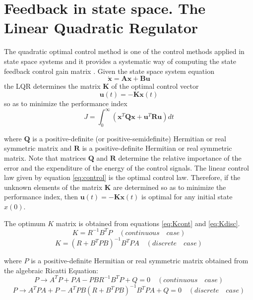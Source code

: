 \section{Feedback in state space. The Linear Quadratic Regulator}
\label{chap:control_sec:lqrDesign}
The quadratic optimal control method is one of the control methods applied in state space systems and it provides a systematic way of computing the state feedback control gain matrix \cite{Ogata}.
Given the state space system equation
\begin{equation}
\mathbf{\dot{x}} = \mathbf{A}\textbf{x} + \mathbf{B}\mathbf{u}
\end{equation}
the LQR determines the matrix $\mathbf{K}$ of the optimal control vector
\begin{equation}
\mathbf{u}(t) = -\mathbf{Kx}(t)
\label{eq:control}
\end{equation}
so as to minimize the performance index
\begin{equation}
J = \int_{0}^{\infty}(\mathbf{x}^{T}\mathbf{Qx}+\mathbf{u}^{T}\mathbf{Ru}) dt
\end{equation}

where $\mathbf{Q}$ is a positive-definite (or positive-semidefinite) Hermitian or real symmetric matrix and $\mathbf{R}$ is a positive-definite Hermitian or real symmetric matrix. Note that matrices $\mathbf{Q}$ and $\mathbf{R}$ determine the relative importance of the error and the expenditure of the energy of the control signals.
The linear control law given by equation \eqref{eq:control} is the optimal control law. Therefore, if the unknown elements of the matrix $\mathbf{K}$ are determined so as to minimize the performance index, then $\mathbf{u}(t) = -\mathbf{Kx}(t)$  is optimal for any initial state $x(0)$. 

The optimum $K$ matrix is obtained from equations \ref{eq:Kcont} and \ref{eq:Kdisc}.
\begin{equation}
K = R^{-1}B^{T}P \quad (continuous \quad case)
\label{eq:Kcont}
\end{equation}
\begin{equation}
K = (R + B^{T}PB)^{-1}B^{T}PA \quad (discrete \quad case)
\label{eq:Kdisc}
\end{equation}

where $P$ is a positive-definite Hermitian or real symmetric matrix obtained from the algebraic Ricatti Equation:
\begin{equation}
P \rightarrow A^{T}P+PA-PBR^{-1}B^{T}P+Q = 0 \quad (continuous \quad case)
\end{equation}
\begin{equation}
P \rightarrow A^{T}PA+P-A^{T}PB(R+B^{T}PB)^{-1}B^{T}PA+Q = 0 \quad (discrete \quad case)
\end{equation}


